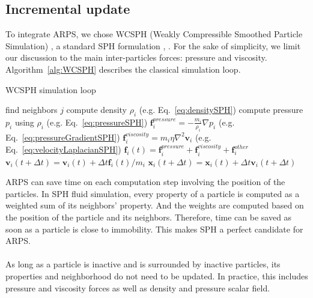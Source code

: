 \subsection{ Incremental update }
To integrate ARPS, we chose WCSPH (Weakly Compressible Smoothed Particle Simulation) \cite{Becker2007WCSPH}, a standard SPH formulation \cite{Desbrun1996}, \cite{Muller2003}. For the sake of simplicity, we limit our discussion to the main inter-particles forces: pressure and viscosity. 
Algorithm~\ref{alg:WCSPH} describes the classical simulation loop.

\newpage

\begin{algorithm}[H]
    \caption[ARPS: WCSPH simulation]{WCSPH simulation loop}
    \label{alg:WCSPH}
    \begin{algorithmic}
	    \State find neighbors $j$
    \EndFor
    \State compute density $\rho_{i}$ (e.g. Eq.~\ref{eq:densitySPH})
    \State compute pressure $p_{i}$ using $\rho_{i}$ (e.g. Eq.~\ref{eq:pressureSPH})
    \EndFor
    \State $\displaystyle \mathbf{f}_{i}^{pressure} = -\frac{m_{i}}{\rho_{i}}\nabla p_{i}$ (e.g. Eq.~\ref{eq:pressureGradientSPH})
    \State $\displaystyle \mathbf{f}_{i}^{viscosity} = m_{i}\eta\nabla^{2}\mathbf{v}_{i}$ (e.g. Eq.~\ref{eq:velocityLaplacianSPH})
    \State $\displaystyle \mathbf{f}_{i}(t) = \mathbf{f}_{i}^{pressure} + \mathbf{f}_{i}^{viscosity} + \mathbf{f}_{i}^{other}$
    \EndFor
    \State $\mathbf{v}_{i}(t+\Delta t) = \mathbf{v}_{i}(t) + \Delta t \mathbf{f}_{i}(t)/m_{i}$
    \State $\mathbf{x}_{i}(t+\Delta t) = \mathbf{x}_{i}(t) + \Delta t \mathbf{v}_{i}(t+\Delta t)$
    \EndFor
    \end{algorithmic}
\end{algorithm}

ARPS can save time on each computation step involving the position of the particles.
In SPH fluid simulation, every property of a particle is computed as a weighted sum of its neighbors' property.
And the weights are computed based on the position of the particle and its neighbors.
Therefore, time can be saved as soon as a particle is close to immobility. 
This makes SPH a perfect candidate for ARPS.
\paragraph*{}
As long as a particle is inactive and is surrounded by inactive particles, its properties and neighborhood do not need to be updated.
In practice, this includes pressure and viscosity forces as well as density and pressure scalar field.
